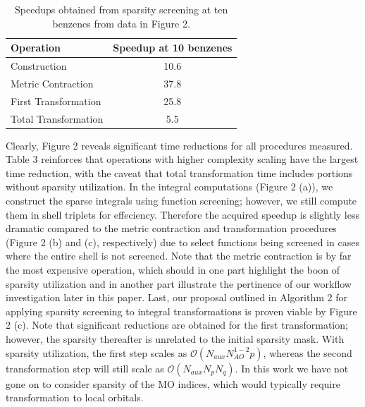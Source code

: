 \begingroup
\begin{table}[H]
\centering
\renewcommand{\baselinestretch}{1}
\caption{Speedups obtained from sparsity screening at ten benzenes from data in Figure 2.}
\begin{tabular}{l c}
\multicolumn{1}{l}{\textbf{Operation}} &
\multicolumn{1}{c}{\textbf{Speedup at 10 benzenes}} \\ 
\hline
Construction          & 10.6  \\          
Metric Contraction    & 37.8  \\          
First Transformation  & 25.8  \\          
Total Transformation  & 5.5  \\          
\end{tabular}
\end{table}
\endgroup


Clearly, Figure 2 reveals significant time reductions for all procedures measured.
Table 3 reinforces that operations with higher complexity scaling have the largest time
reduction, with the caveat that total transformation time includes portions without sparsity utilization.
In the integral computations (Figure 2 (a)), we construct the sparse integrals using
function screening; however, we still compute them in shell triplets for effeciency.
Therefore the acquired speedup is slightly less dramatic compared to the metric contraction and
transformation procedures (Figure 2 (b) and (c), respectively) due to select functions being 
screened in cases where the entire shell is not screened. 
Note that the metric contraction is by far the most expensive operation, which should in one part
highlight the boon of sparsity utilization and in another part
illustrate the pertinence of our workflow investigation later in this paper.
Last, our proposal outlined in Algorithm 2 for applying sparsity screening to integral transformations
is proven viable by Figure 2 (c).  Note that significant reductions are obtained for the
first transformation; however, the sparsity thereafter is unrelated to the initial sparsity
mask. With sparsity utilization, the first step scales as $\mathcal{O}(N_{aux}N_{AO}^{1-2}p)$,
whereas the second transformation step will still scale as $\mathcal{O}(N_{aux}N_pN_q)$.
In this work we have not gone on to consider sparsity of the MO indices, which would 
typically require transformation to local orbitals.


